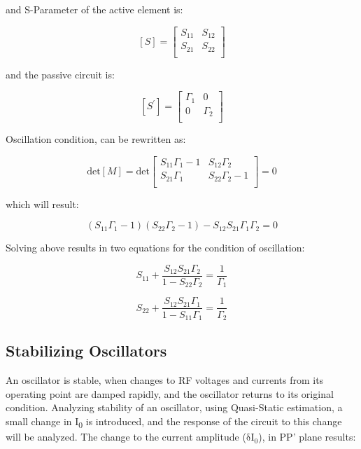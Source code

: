 and S-Parameter of the active element is:

\[\left\lbrack S \right\rbrack = \begin{bmatrix}
S_{\text{11}} & S_{\text{12}} \\
S_{\text{21}} & S_{\text{22}} \\
\end{bmatrix}\]

and the passive circuit is:

\[\left\lbrack S^{'} \right\rbrack = \begin{bmatrix}
\Gamma_{1} & 0 \\
0 & \Gamma_{2} \\
\end{bmatrix}\]

Oscillation condition, can be rewritten as:

\[\text{det}\left\lbrack M \right\rbrack = \text{det}\begin{bmatrix}
S_{\text{11}}\Gamma_{1} - 1 & S_{\text{12}}\Gamma_{2} \\
S_{\text{21}}\Gamma_{1} & S_{\text{22}}\Gamma_{2} - 1 \\
\end{bmatrix} = 0\]

which will result:

\[\left( S_{11}\Gamma_{1} - 1 \right)\left( S_{22}\Gamma_{2} - 1 \right) - S_{12}S_{21}\Gamma_{1}\Gamma_{2} = 0\]

Solving above results in two equations for the condition of oscillation:

\[S_{11} + \frac{S_{12}S_{21}\Gamma_{2}}{1 - S_{22}\Gamma_{2}} = \frac{1}{\Gamma_{1}}\]

\[S_{22} + \frac{S_{12}S_{21}\Gamma_{1}}{1 - S_{11}\Gamma_{1}} = \frac{1}{\Gamma_{2}}\]

\hypertarget{stabilizing-oscillators}{%
\subsection{Stabilizing Oscillators}\label{stabilizing-oscillators}}

An oscillator is stable, when changes to RF voltages and currents from
its operating point are damped rapidly, and the oscillator returns to
its original condition. Analyzing stability of an oscillator, using
Quasi-Static estimation, a small change in I\textsubscript{0} is
introduced, and the response of the circuit to this change will be
analyzed. The change to the current amplitude (\(\text{δI}_{0}\)), in
PP' plane results:

